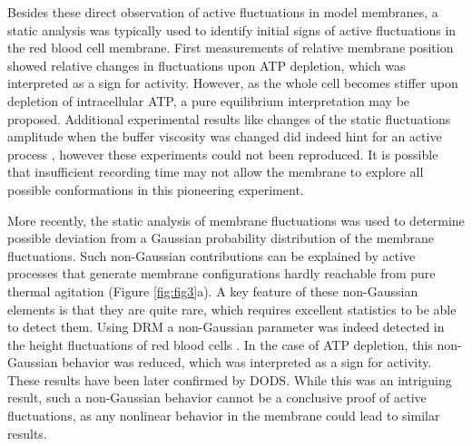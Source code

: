 \documentclass[graybox]{svmult}
\begin{document}
Besides these direct observation of active fluctuations in model membranes, a static analysis was typically used to identify initial signs of active fluctuations in the red blood cell membrane. First measurements of relative membrane position showed relative changes in fluctuations upon ATP depletion, which was interpreted as a sign for activity. However, as the whole cell becomes stiffer upon depletion of intracellular ATP, a pure equilibrium interpretation may be proposed. Additional experimental results like changes of the static fluctuations amplitude when the buffer viscosity was changed did indeed hint for an active process \cite{Tuvia:1997}, however these experiments could not been reproduced. It is possible that insufficient recording time may not allow the membrane to explore all possible conformations in this pioneering experiment. 

More recently, the static analysis of membrane fluctuations was used to determine possible deviation from a Gaussian probability distribution of the membrane fluctuations. Such non-Gaussian contributions can be explained by active processes that generate membrane configurations hardly reachable from pure thermal agitation (Figure \ref{fig:fig3}a). A key feature of these non-Gaussian elements is that they are quite rare, which requires excellent statistics to be able to detect them. Using DRM a non-Gaussian parameter was indeed detected in the height fluctuations of red blood cells \cite{Park:2010}. In the case of ATP depletion, this non-Gaussian behavior was reduced, which was interpreted as a sign for activity. These results have been later confirmed by DODS. While this was an intriguing result, such a non-Gaussian behavior cannot be a conclusive proof of active fluctuations, as any nonlinear behavior in the membrane could lead to similar results. 

\end{document}
